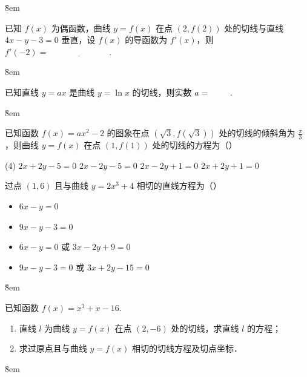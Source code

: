 \v{8em}

\begin{example}
    已知 $f(x)$ 为偶函数，曲线 $y = f(x)$ 在点 $(2,f(2))$ 处的切线与直线 $4x - y - 3 = 0$ 垂直，设 $f(x)$ 的导函数为 $f'(x)$，则 $f'(-2) = \underline{\hspace{3cm}}$.
\end{example}

\v{8em}

\begin{example}
    已知直线 $y=a x$ 是曲线 $y=\ln x$ 的切线，则实数 $a=$ \underline{$\qquad$}.
\end{example}

\v{8em}

\begin{example}
    已知函数 $f(x)=a x^2-2$ 的图象在点 $(\sqrt{3}, f(\sqrt{3}))$ 处的切线的倾斜角为 $\frac{\pi}{3}$ ，则曲线 $y=f(x)$ 在点 $(1, f(1))$ 处的切线的方程为（\quad）
    \begin{tasks}(4)
        \task $2 x+2 y-5=0$
        \task $2 x-2 y-5=0$
        \task $2 x-2 y+1=0$
        \task $2 x+2 y+1=0$
    \end{tasks}
\end{example}

\begin{example}
    过点 $(1,6)$ 且与曲线 $y=2 x^3+4$ 相切的直线方程为（\quad）
    \begin{itemize}
        \item $6 x-y=0$
        \item $9 x-y-3=0$
        \item $6 x-y=0$ 或 $3 x-2 y+9=0$
        \item $9 x-y-3=0$ 或 $3 x+2 y-15=0$
    \end{itemize}
\end{example}

\v{8em}

\begin{example}
    已知函数 $f(x) = x^{3} + x - 16$.
    \begin{enumerate}
        \item[(1)] 直线 $l$ 为曲线 $y = f(x)$ 在点 $(2, -6)$ 处的切线，求直线 $l$ 的方程；
        \item[(2)] 求过原点且与曲线 $y = f(x)$ 相切的切线方程及切点坐标．
    \end{enumerate}
\end{example}

\v{8em}
